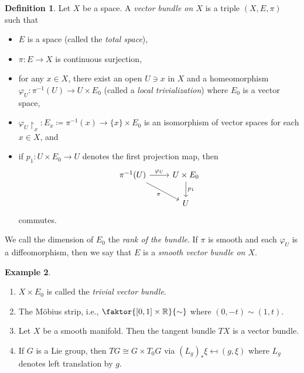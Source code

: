 \documentclass[10pt,letterpaper,cm]{nupset}
\theoremstyle{definition}
\newtheorem{definition}{Definition}[subsection]
\newtheorem{exmp}[definition]{Example}
\theoremstyle{theorem}
\theoremstyle{remark}
\newcommand{\R}{\mathbb{R}}
\newcommand{\1}{\mathbb{1}}
\newcommand{\0}{\vec 0}
\begin{document}
\begin{definition}
Let $X$ be a space. A \textit{vector bundle on $X$} is a triple $(X, E, \pi)$ such that
\begin{itemize}
\item $E$ is a space (called the \textit{total space}), 
\item $\pi: E \to X$ is continuous surjection,
\item for any $x\in X$, there exist an open $U \ni x$ in $X$ and a homeomorphism $\varphi_U : \pi^{-1}(U) \to U \times E_0$ (called a \textit{local trivialization}) where $E_0$ is a vector space,
\item  $\varphi_U\restriction_x : E_x\coloneqq \pi^{-1}(x) \to \{x\} \times E_0$ is an isomorphism of vector spaces for each $x\in X$, and
\item if $p_1 : U \times E_0 \to U$ denotes the first projection map, then
\[
\begin{tikzcd}
\pi^{-1}(U) \arrow[r, "\varphi_U"] \arrow[rd, "\pi"'] & U \times E_0 \arrow[d, "p_1"] \\
                                                      & U                            
\end{tikzcd}
\]
commutes.
\end{itemize}
We call the dimension of $E_0$ the \textit{rank of the bundle}. If $\pi$ is smooth and each $\varphi_U$ is a diffeomorphism, then we say that $E$ is a \textit{smooth vector bundle on $X$}.
\end{definition}

\begin{exmp} $ $
\begin{enumerate}
\item $X \times E_0$ is called the \textit{trivial vector bundle}.
\item  The M\"obius strip, i.e., $\faktor{[0,1]\times \R}{\sim}$ where $(0, {-}t) \sim (1, t)$.
\item Let $X$ be a smooth manifold. Then the tangent bundle $T{X}$ is a vector bundle. 
\item If $G$ is a Lie group, then $T{G} \cong G \times T_0{G}$ via $(L_g)_{\ast}{\xi} \mapsfrom (g, \xi)$ where  $L_g$ denotes left translation by $g$. 
\end{enumerate}
\end{exmp}
\end{document}
